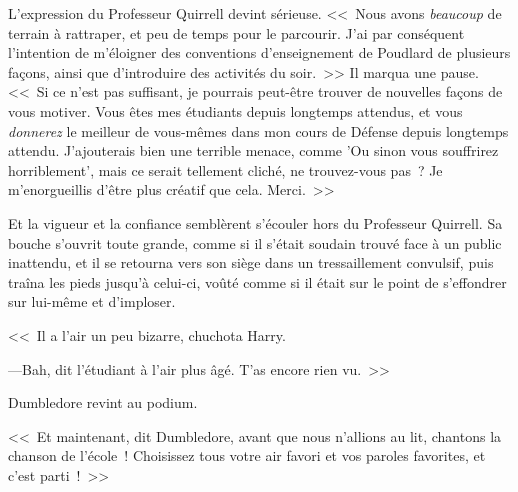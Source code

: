 L'expression du Professeur Quirrell devint sérieuse. <<~Nous avons \emph{beaucoup} de terrain à rattraper, et peu de temps pour le parcourir. J'ai par conséquent l'intention de m'éloigner des conventions d'enseignement de Poudlard de plusieurs façons, ainsi que d'introduire des activités du soir.~>> Il marqua une pause. <<~Si ce n'est pas suffisant, je pourrais peut-être trouver de nouvelles façons de vous motiver. Vous êtes mes étudiants depuis longtemps attendus, et vous \emph{donnerez} le meilleur de vous-mêmes dans mon cours de Défense depuis longtemps attendu. J'ajouterais bien une terrible menace, comme 'Ou sinon vous souffrirez horriblement', mais ce serait tellement cliché, ne trouvez-vous pas~? Je m'enorgueillis d'être plus créatif que cela. Merci.~>>

Et la vigueur et la confiance semblèrent s'écouler hors du Professeur Quirrell. Sa bouche s'ouvrit toute grande, comme si il s'était soudain trouvé face à un public inattendu, et il se retourna vers son siège dans un tressaillement convulsif, puis traîna les pieds jusqu'à celui-ci, voûté comme si il était sur le point de s'effondrer sur lui-même et d'imploser.

<<~Il a l'air un peu bizarre, chuchota Harry.

---Bah, dit l'étudiant à l'air plus âgé. T'as encore rien vu.~>>

Dumbledore revint au podium.

<<~Et maintenant, dit Dumbledore, avant que nous n'allions au lit, chantons la chanson de l'école~! Choisissez tous votre air favori et vos paroles favorites, et c'est parti~!~>> 

